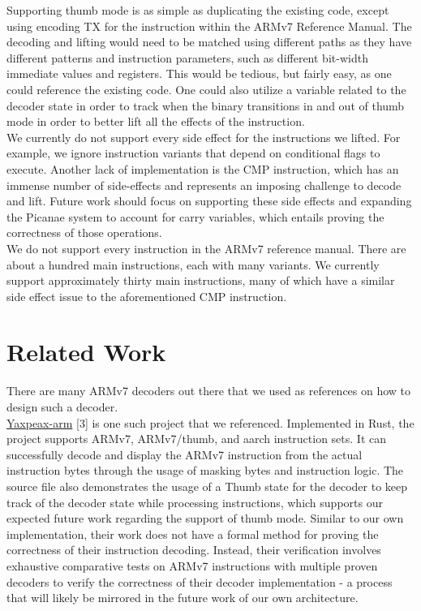 \documentclass[twocolumn]{article}
\begin{document}
Supporting thumb mode is as simple as duplicating the existing code, except using encoding TX for the instruction within the ARMv7 Reference Manual. The decoding and lifting would need to be matched using different paths as they have different patterns and instruction parameters, such as different bit-width immediate values and registers. This would be tedious, but fairly easy, as one could reference the existing code. One could also utilize a variable related to the decoder state in order to track when the binary transitions in and out of thumb mode in order to better lift all the effects of the instruction.\\

We currently do not support every side effect for the instructions we lifted. For example, we ignore instruction variants that depend on conditional flags to execute. Another lack of implementation is the CMP instruction, which has an immense number of side-effects and represents an imposing challenge to decode and lift. Future work should focus on supporting these side effects and expanding the Picanae system to account for carry variables, which entails proving the correctness of those operations. \\

We do not support every instruction in the ARMv7 reference manual. There are about a hundred main instructions, each with many variants. We currently support approximately thirty main instructions, many of which have a similar side effect issue to the aforementioned CMP instruction.

\section*{\centering Related Work}
\vspace{0.3cm}

There are many ARMv7 decoders out there that we used as references on how to design such a decoder.\\

\href{https://github.com/iximeow/yaxpeax-arm}{Yaxpeax-arm} [3] is one such project that we referenced. Implemented in Rust, the project supports ARMv7, ARMv7/thumb, and aarch instruction sets. It can successfully decode and display the ARMv7 instruction from the actual instruction bytes through the usage of masking bytes and instruction logic. The source file also demonstrates the usage of a Thumb state for the decoder to keep track of the decoder state while processing instructions, which supports our expected future work regarding the support of thumb mode. Similar to our own implementation, their work does not have a formal method for proving the correctness of their instruction decoding. Instead, their verification involves exhaustive comparative tests on ARMv7 instructions with multiple proven decoders to verify the correctness of their decoder implementation - a process that will likely be mirrored in the future work of our own architecture.\\
\end{document}
